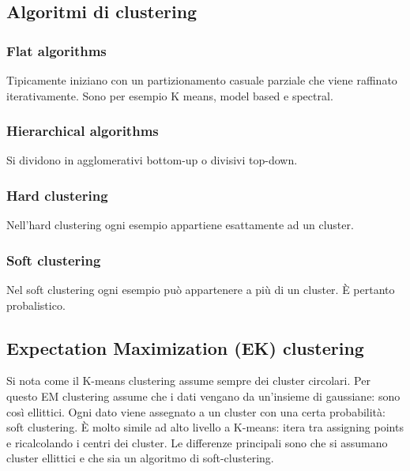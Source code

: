 	\subsection{Algoritmi di clustering}

		\subsubsection{Flat algorithms}
		Tipicamente iniziano con un partizionamento casuale parziale che viene raffinato iterativamente.
		Sono per esempio K means, model based e spectral.
		
		\subsubsection{Hierarchical algorithms}
		Si dividono in agglomerativi bottom-up o divisivi top-down.
		
		\subsubsection{Hard clustering}
		Nell'hard clustering ogni esempio appartiene esattamente ad un cluster.
		
		\subsubsection{Soft clustering}
		Nel soft clustering ogni esempio pu\`o appartenere a pi\`u di un cluster.
		\`E pertanto probalistico.

	\subsection{Expectation Maximization (EK) clustering}
	Si nota come il K-means clustering assume sempre dei cluster circolari.
	Per questo EM clustering assume che i dati vengano da un'insieme di gaussiane: sono cos\`i ellittici.
	Ogni dato viene assegnato a un cluster con una certa probabilit\`a: soft clustering.
	\`E molto simile ad alto livello a K-means: itera tra assigning points e ricalcolando i centri dei cluster.
	Le differenze principali sono che si assumano cluster ellittici e che sia un algoritmo di soft-clustering.
	
